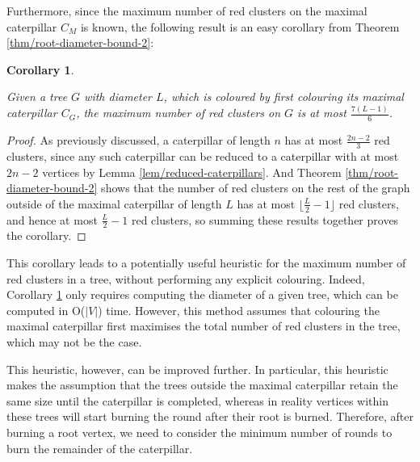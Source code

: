 \documentclass{mpaper}
\newtheorem{corollary}{Corollary}[section]
\begin{document}
Furthermore, since the maximum number of red clusters on the maximal caterpillar $C_M$ is known, the following result is an easy corollary from Theorem \ref{thm/root-diameter-bound-2}:

\begin{corollary}
\label{cor/diameter_bound_full}

Given a tree $G$ with diameter $L$, which is coloured by first colouring its maximal caterpillar $C_G$, the maximum number of red clusters on $G$ is at most $\frac{7(L-1)}{6}$.
\end{corollary}

\begin{proof}
  As previously discussed, a caterpillar of length $n$ has at most $\frac{2n-2}{3}$ red clusters, since any such caterpillar can be reduced to a caterpillar with at most $2n-2$ vertices by Lemma \ref{lem/reduced-caterpillars}. And Theorem \ref{thm/root-diameter-bound-2} shows that the number of red clusters on the rest of the graph outside of the maximal caterpillar of length $L$ has at most $\lfloor \frac{L}{2} - 1 \rfloor$ red clusters, and hence at most $\frac{L}{2} - 1$ red clusters, so summing these results together proves the corollary.
\end{proof}

This corollary leads to a potentially useful heuristic for the maximum number of red clusters in a tree, without performing any explicit colouring. Indeed, Corollary \ref{cor/diameter_bound_full} only requires computing the diameter of a given tree, which can be computed in O($|V|$) time. However, this method assumes that colouring the maximal caterpillar first maximises the total number of red clusters in the tree, which may not be the case.

This heuristic, however, can be improved further. In particular, this heuristic makes the assumption that the trees outside the maximal caterpillar retain the same size until the caterpillar is completed, whereas in reality vertices within these trees will start burning the round after their root is burned. Therefore, after burning a root vertex, we need to consider the minimum number of rounds to burn the remainder of the caterpillar.
\end{document}
